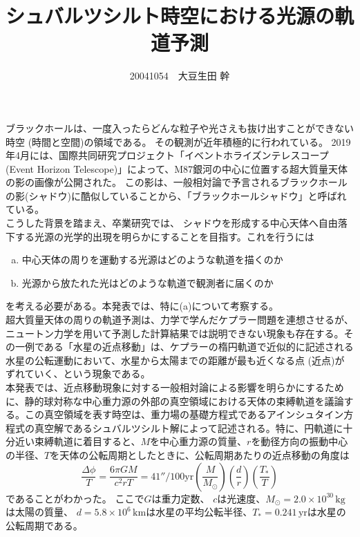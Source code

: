 \documentclass[dvipdfmx]{jsarticle} %
\title{シュバルツシルト時空における光源の軌道予測}
\author{20041054　大豆生田 幹}
\date{}
\begin{document}
\fontsize{14pt}{14pt}\selectfont 
\maketitle

\fontsize{11pt}{11pt}\selectfont 

ブラックホールは、一度入ったらどんな粒子や光さえも抜け出すことができない時空 (時間と空間)の領域である。
その観測が近年積極的に行われている。
2019年4月には、国際共同研究プロジェクト「イベントホライズンテレスコープ (Event Horizon Telescope)」によって、M87銀河の中心に位置する超大質量天体の影の画像が公開された。
この影は、一般相対論で予言されるブラックホールの影(シャドウ)に酷似していることから、「ブラックホールシャドウ」と呼ばれている。\\


こうした背景を踏まえ、卒業研究では、
シャドウを形成する中心天体へ自由落下する光源の光学的出現を明らかにすることを目指す。これを行うには
\begin{enumerate}[(a)\,]
\item 中心天体の周りを運動する光源はどのような軌道を描くのか\\
\item 光源から放たれた光はどのような軌道で観測者に届くのか
\end{enumerate}
を考える必要がある。本発表では、特に(a)について考察する。\\

超大質量天体の周りの軌道予測は、力学で学んだケプラー問題を連想させるが、ニュートン力学を用いて予測した計算結果では説明できない現象も存在する。その一例である「水星の近点移動」は、ケプラーの楕円軌道で近似的に記述される水星の公転運動において、水星から太陽までの距離が最も近くなる点 (近点)がずれていく、という現象である。\\

本発表では、近点移動現象に対する一般相対論による影響を明らかにするために、静的球対称な中心重力源の外部の真空領域における天体の束縛軌道を議論する。この真空領域を表す時空は、重力場の基礎方程式であるアインシュタイン方程式の真空解であるシュバルツシルト解によって記述される。特に、円軌道に十分近い束縛軌道に着目すると、$M$を中心重力源の質量、$r$を動径方向の振動中心の半径、$T$を天体の公転周期としたときに、公転周期あたりの近点移動の角度は
$$
\frac{\Delta \phi}{T} = \frac{6 \pi GM}{c^2rT} 
= 41'' \mathrm{/100yr}
\left( \frac{M}{M_{\odot}} \right) \left( \frac{d}{r} \right)\left( \frac{T_*}{T} \right)
$$
であることがわかった。
ここで$G$は重力定数、
$c$は光速度、$M_{\odot}=2.0\times 10^{30}\mathrm{\,kg}$は太陽の質量、
$d= 5.8\times 10^6 \mathrm{\,km}$は水星の平均公転半径、$T_*=0.241\mathrm{\,yr}$は水星の公転周期である。\\
\end{document}
